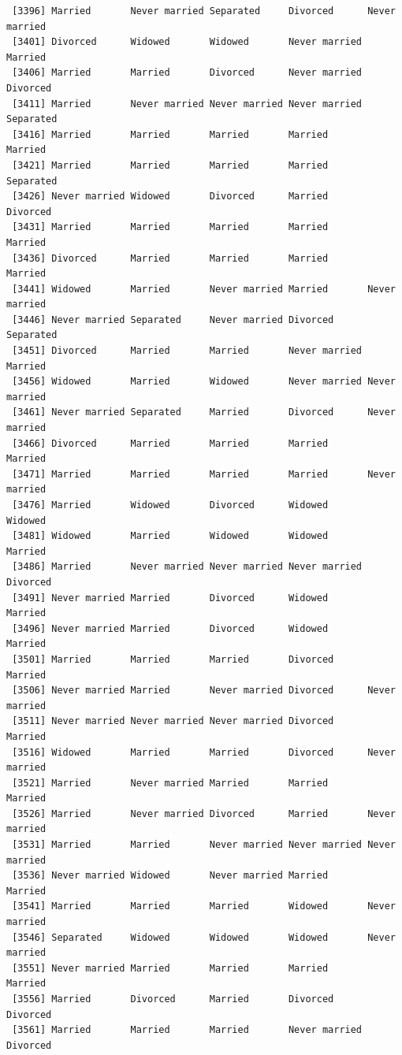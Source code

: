 \documentclass[
  letterpaper,
  DIV=11,
  numbers=noendperiod,
  oneside]{scrartcl}
\begin{document}
\begin{verbatim}
 [3396] Married       Never married Separated     Divorced      Never married
 [3401] Divorced      Widowed       Widowed       Never married Married      
 [3406] Married       Married       Divorced      Never married Divorced     
 [3411] Married       Never married Never married Never married Separated    
 [3416] Married       Married       Married       Married       Married      
 [3421] Married       Married       Married       Married       Separated    
 [3426] Never married Widowed       Divorced      Married       Divorced     
 [3431] Married       Married       Married       Married       Married      
 [3436] Divorced      Married       Married       Married       Married      
 [3441] Widowed       Married       Never married Married       Never married
 [3446] Never married Separated     Never married Divorced      Separated    
 [3451] Divorced      Married       Married       Never married Married      
 [3456] Widowed       Married       Widowed       Never married Never married
 [3461] Never married Separated     Married       Divorced      Never married
 [3466] Divorced      Married       Married       Married       Married      
 [3471] Married       Married       Married       Married       Never married
 [3476] Married       Widowed       Divorced      Widowed       Widowed      
 [3481] Widowed       Married       Widowed       Widowed       Married      
 [3486] Married       Never married Never married Never married Divorced     
 [3491] Never married Married       Divorced      Widowed       Married      
 [3496] Never married Married       Divorced      Widowed       Married      
 [3501] Married       Married       Married       Divorced      Married      
 [3506] Never married Married       Never married Divorced      Never married
 [3511] Never married Never married Never married Divorced      Married      
 [3516] Widowed       Married       Married       Divorced      Never married
 [3521] Married       Never married Married       Married       Married      
 [3526] Married       Never married Divorced      Married       Never married
 [3531] Married       Married       Never married Never married Never married
 [3536] Never married Widowed       Never married Married       Married      
 [3541] Married       Married       Married       Widowed       Never married
 [3546] Separated     Widowed       Widowed       Widowed       Never married
 [3551] Never married Married       Married       Married       Married      
 [3556] Married       Divorced      Married       Divorced      Divorced     
 [3561] Married       Married       Married       Never married Divorced     

\end{verbatim}
\end{document}
